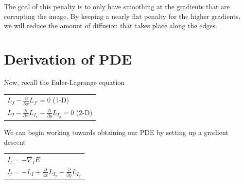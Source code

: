 \documentclass{article}
\begin{document}
  \noindent
  The goal of this penalty is to only have smoothing at the gradients
  that are corrupting the image. By keeping a nearly flat penalty for
  the higher gradients, we will reduce the amount of diffusion that
  takes place along the edges.




  \newpage
  \section{Derivation of PDE}

    \noindent Now, recall the Euler-Lagrange equation
      \begin{center}
        \begin{tabular}{l}
          \vspace{12pt}
          $L_{f} - \frac{\partial}{\partial x}L_{f'} = 0$ (1-D)\\
          $L_{I} - \frac{\partial}{\partial x}L_{I_{x}} - \frac{\partial}{\partial y}L_{I_{y}} = 0$ (2-D)\\
        \end{tabular}
      \end{center}
    \vspace{12pt}

    \noindent
    We can begin working towards obtaining our PDE by setting up a gradient descent
      \begin{center}
        \begin{tabular}{l}
          \vspace{12pt}
          $I_{t} = -\nabla_{I}E$\\
          $I_{t} = -L_{I} + \frac{\partial}{\partial x}L_{I_{x}} + \frac{\partial}{\partial y}L_{I_{y}}$
        \end{tabular}
      \end{center}
    \vspace{12pt}
\end{document}
